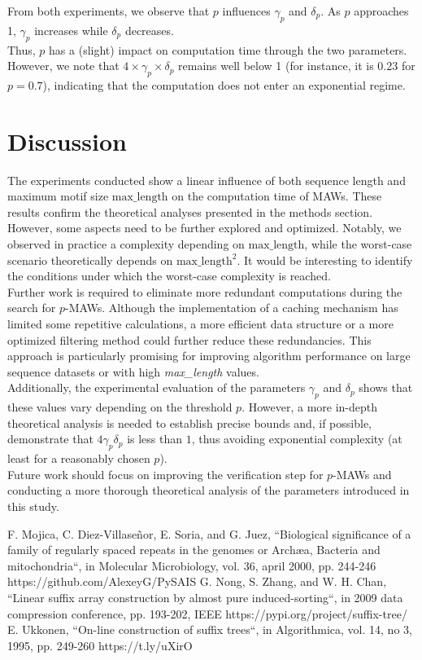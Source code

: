 \documentclass[conference]{IEEEtran}
\begin{document}
From both experiments, we observe that $p$ influences $\gamma_p$ and $\delta_p$. As $p$ approaches 1, $\gamma_p$ increases while $\delta_p$ decreases.\\
Thus, $p$ has a (slight) impact on computation time through the two parameters.\\
However, we note that $4 \times \gamma_p \times \delta_p$ remains well below 1 (for instance, it is 0.23 for $p = 0.7$), indicating that the computation does not enter an exponential regime.

\section{Discussion}
The experiments conducted show a linear influence of both sequence length and maximum motif size $\text{max\_length}$ on the computation time of MAWs. These results confirm the theoretical analyses presented in the methods section. However, some aspects need to be further explored and optimized. Notably, we observed in practice a complexity depending on $\text{max\_length}$, while the worst-case scenario theoretically depends on $\text{max\_length}^2$. It would be interesting to identify the conditions under which the worst-case complexity is reached.\\

Further work is required to eliminate more redundant computations during the search for $p$-MAWs. Although the implementation of a caching mechanism has limited some repetitive calculations, a more efficient data structure or a more optimized filtering method could further reduce these redundancies. This approach is particularly promising for improving algorithm performance on large sequence datasets or with high \textit{max\_length} values.\\

Additionally, the experimental evaluation of the parameters $\gamma_p$ and $\delta_p$ shows that these values vary depending on the threshold $p$. However, a more in-depth theoretical analysis is needed to establish precise bounds and, if possible, demonstrate that $4\gamma_p\delta_p$ is less than $1$, thus avoiding exponential complexity (at least for a reasonably chosen $p$).\\

Future work should focus on improving the verification step for $p$-MAWs and conducting a more thorough theoretical analysis of the parameters introduced in this study.

\begin{thebibliography}{00}
 F. Mojica, C. Diez-Villase\~nor, E. Soria, and G. Juez, ``Biological significance of a family of regularly spaced repeats in the genomes or Archæa, Bacteria and mitochondria``, in Molecular Microbiology, vol. 36, april 2000, pp. 244-246
 https://github.com/AlexeyG/PySAIS
  G. Nong, S. Zhang, and W. H. Chan, ``Linear suffix array construction by almost pure induced-sorting``, in 2009 data compression conference, pp. 193-202, IEEE
 https://pypi.org/project/suffix-tree/
 E. Ukkonen, ``On-line construction of suffix trees``, in Algorithmica, vol. 14, no 3, 1995, pp. 249-260
 https://t.ly/uXirO
\end{thebibliography}
\end{document}
